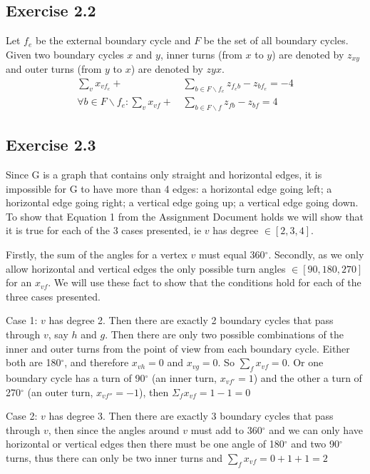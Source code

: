 \subsection{Exercise 2.2}
Let \(f_e\) be the external boundary cycle and \(F\) be the set of all boundary cycles. Given two boundary cycles \(x\) and \(y\), inner turns (from \(x\) to \(y\)) are denoted by \(z_{xy}\) and outer turns (from \(y\) to \(x\)) are denoted by \(z{yx}\).
\begin{align}
  \sum_{v} x_{vf_{e}} +&\, \sum_{b\in F \backslash {f_e}} z_{f_{e}b} - z_{bf_{e}} = -4\\
  \forall b \in F \backslash {f_e}:\sum_{v} x_{vf} +&\, \sum_{b\in F \backslash {f}} z_{fb} - z_{bf} = 4
\end{align}

\subsection{Exercise 2.3}
Since G is a graph that contains only straight and horizontal edges, it is impossible for G to have more than 4 edges: a horizontal edge going left; a horizontal edge going right; a vertical edge going up; a vertical edge going down. To show that Equation 1 from the Assignment Document holds we will show that it is true for each of the 3 cases presented, ie \(v\) has degree \(\in [2,3,4]\).

Firstly, the sum of the angles for a vertex \(v\) must equal 360\(^\circ\). Secondly, as we only allow horizontal and vertical edges the only possible turn angles \(\in [90,180,270] \) for an \(x_{vf}\). We will use these fact to show that the conditions hold for each of the three cases presented.

Case 1: \(v\) has degree 2.\newline
Then there are exactly 2 boundary cycles that pass through \(v\), say \(h\) and \(g\). Then there are only two possible combinations of the inner and outer turns from the point of view from each boundary cycle. Either both are 180\(^\circ\), and therefore \( x_{vh} = 0 \) and  \( x_{vg} = 0 \). So \(\sum_f x_{vf} = 0 \). Or one boundary cycle has a turn of 90\(^\circ\) (an inner turn, \(x_{vf'} = 1\)) and the other a turn of 270\(^\circ\) (an outer turn,  \(x_{vf''} = -1\)), then \(\Sigma_f x_{vf} = 1 - 1 = 0 \)

Case 2: \(v\) has degree 3.\newline
Then there are exactly 3 boundary cycles that pass through \(v\), then since the angles around \(v\) must add to 360\(^\circ\) and we can only have horizontal or vertical edges then there must be one angle of 180\(^\circ\) and two 90\(^\circ\) turns, thus there can only be two inner turns and  \(\sum_f x_{vf} = 0 + 1+ 1= 2 \)


